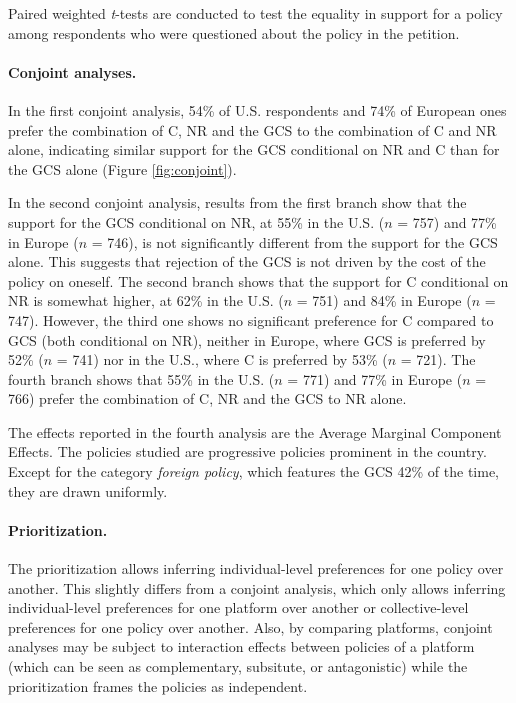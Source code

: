 \begin{small}
Paired weighted \textit{t}-tests are conducted to test the equality in support for a policy among respondents who were questioned about the policy in the petition.

\paragraph{\small Conjoint analyses.}
In the first conjoint analysis, 54\% of %
U.S. respondents and 74\% of %
European ones prefer the combination of C, NR and the GCS to the combination of C and NR alone, indicating similar support for the GCS conditional on NR and C than for the GCS alone (Figure \ref{fig:conjoint}). 

In the second conjoint analysis, results from the first branch show that the support for the GCS conditional on NR, at 55\% in the U.S. ($n$ = 757) and 77\% in Europe ($n$ = 746), is not significantly different from the support for the GCS alone. This suggests that rejection of the GCS is not driven by the cost of the policy on oneself. The second branch shows that the support for C conditional on NR is somewhat higher, at 62\% in the U.S. ($n$ = 751) and 84\% in Europe ($n$ = 747). However, the third one shows no significant preference for C compared to GCS (both conditional on NR), neither in Europe, where GCS is preferred by 52\% ($n$ = 741) nor in the U.S., where C is preferred by 53\% ($n$ = 721). The fourth branch shows that 55\% in the U.S. ($n$ = 771) and 77\% in Europe ($n$ = 766) prefer the combination of C, NR and the GCS to NR alone.

The effects reported in the fourth analysis are the Average Marginal Component Effects.\cite{hainmueller_causal_2014} The policies studied are progressive policies prominent in the country. Except for the category \textit{foreign policy}, which features the GCS 42\% of the time, they are drawn uniformly.

\paragraph{\small Prioritization.}
The prioritization allows inferring individual-level preferences for one policy over another. This slightly differs from a conjoint analysis, which only allows inferring individual-level preferences for one platform over another or collective-level preferences for one policy over another. Also, by comparing platforms, conjoint analyses may be subject to interaction effects between policies of a platform (which can be seen as complementary, subsitute, or antagonistic) while the prioritization frames the policies as independent.


\end{small}
